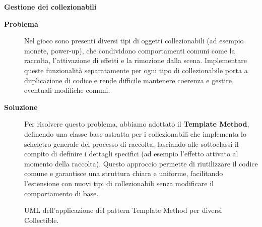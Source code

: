 \documentclass[a4paper,12pt]{report}
\begin{document}
\noindent
\textbf{Gestione dei collezionabili}
\begin{description}
	\item[\textbf{Problema}]
	      Nel gioco sono presenti diversi tipi di oggetti collezionabili (ad esempio monete, power-up), che condividono comportamenti comuni come la raccolta, l'attivazione di effetti e
	      la rimozione dalla scena. Implementare queste funzionalità separatamente per ogni tipo di collezionabile porta a duplicazione di codice e rende difficile mantenere
	      coerenza e gestire eventuali modifiche comuni.

	\item[\textbf{Soluzione}]
	      Per risolvere questo problema, abbiamo adottato il \textbf{Template Method}, definendo una classe base astratta per i collezionabili che implementa lo scheletro generale del
	      processo di raccolta, lasciando alle sottoclassi il compito di definire i dettagli specifici (ad esempio l'effetto attivato al momento della raccolta). Questo approccio
	      permette di riutilizzare il codice comune e garantisce una struttura chiara e uniforme, facilitando l'estensione con nuovi tipi di collezionabili
	      senza modificare il comportamento di base.
\end{description}
\begin{figure}[H]
	\centering{}
	
	\caption{UML dell'applicazione del pattern Template Method per diversi Collectible.}
	\label{img:collectible}
\end{figure}
\end{document}
